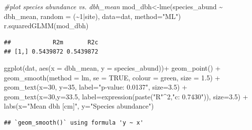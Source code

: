 \documentclass[
]{article}
\newenvironment{Shaded}{\begin{snugshade}}{\end{snugshade}}
\newcommand{\AttributeTok}[1]{\textcolor[rgb]{0.77,0.63,0.00}{#1}}
\newcommand{\CommentTok}[1]{\textcolor[rgb]{0.56,0.35,0.01}{\textit{#1}}}
\newcommand{\ConstantTok}[1]{\textcolor[rgb]{0.00,0.00,0.00}{#1}}
\newcommand{\DecValTok}[1]{\textcolor[rgb]{0.00,0.00,0.81}{#1}}
\newcommand{\FloatTok}[1]{\textcolor[rgb]{0.00,0.00,0.81}{#1}}
\newcommand{\FunctionTok}[1]{\textcolor[rgb]{0.00,0.00,0.00}{#1}}
\newcommand{\NormalTok}[1]{#1}
\newcommand{\OtherTok}[1]{\textcolor[rgb]{0.56,0.35,0.01}{#1}}
\newcommand{\SpecialCharTok}[1]{\textcolor[rgb]{0.00,0.00,0.00}{#1}}
\newcommand{\StringTok}[1]{\textcolor[rgb]{0.31,0.60,0.02}{#1}}
\begin{document}
\begin{Shaded}
\begin{Highlighting}[]
 \CommentTok{\#plot species abundance vs. dbh\_mean}
\NormalTok{mod\_dbh}\OtherTok{\textless{}{-}}\FunctionTok{lme}\NormalTok{(species\_abund }\SpecialCharTok{\textasciitilde{}}\NormalTok{ dbh\_mean, }\AttributeTok{random =}\NormalTok{ (}\SpecialCharTok{\textasciitilde{}}\DecValTok{1}\SpecialCharTok{|}\NormalTok{site), }\AttributeTok{data=}\NormalTok{dat, }\AttributeTok{method=}\StringTok{"ML"}\NormalTok{)}
\FunctionTok{r.squaredGLMM}\NormalTok{(mod\_dbh)}
\end{Highlighting}
\end{Shaded}

\begin{verbatim}
##            R2m       R2c
## [1,] 0.5439872 0.5439872
\end{verbatim}

\begin{Shaded}
\begin{Highlighting}[]
\FunctionTok{ggplot}\NormalTok{(dat, }\FunctionTok{aes}\NormalTok{(}\AttributeTok{x =}\NormalTok{ dbh\_mean, }\AttributeTok{y =}\NormalTok{ species\_abund))}\SpecialCharTok{+}
  \FunctionTok{geom\_point}\NormalTok{() }\SpecialCharTok{+}
  \FunctionTok{geom\_smooth}\NormalTok{(}\AttributeTok{method =}\NormalTok{ lm, }\AttributeTok{se =} \ConstantTok{TRUE}\NormalTok{, }\AttributeTok{colour =} \StringTok{\textquotesingle{}green\textquotesingle{}}\NormalTok{, }\AttributeTok{size =} \FloatTok{1.5}\NormalTok{) }\SpecialCharTok{+}
  \FunctionTok{geom\_text}\NormalTok{(}\AttributeTok{x=}\DecValTok{30}\NormalTok{, }\AttributeTok{y=}\DecValTok{35}\NormalTok{, }\AttributeTok{label=}\StringTok{"p{-}value: 0.0137"}\NormalTok{, }\AttributeTok{size=}\FloatTok{3.5}\NormalTok{) }\SpecialCharTok{+}
  \FunctionTok{geom\_text}\NormalTok{(}\AttributeTok{x=}\DecValTok{30}\NormalTok{,}\AttributeTok{y=}\FloatTok{33.5}\NormalTok{, }\AttributeTok{label=}\FunctionTok{expression}\NormalTok{(}\FunctionTok{paste}\NormalTok{(}\StringTok{"R"}\SpecialCharTok{\^{}}\DecValTok{2}\NormalTok{,}\StringTok{"c: 0.7430"}\NormalTok{)), }\AttributeTok{size=}\FloatTok{3.5}\NormalTok{) }\SpecialCharTok{+}
  \FunctionTok{labs}\NormalTok{(}\AttributeTok{x=}\StringTok{"Mean dbh [cm]"}\NormalTok{, }\AttributeTok{y=}\StringTok{"Species abundance"}\NormalTok{)}
\end{Highlighting}
\end{Shaded}

\begin{verbatim}
## `geom_smooth()` using formula 'y ~ x'
\end{verbatim}
\end{document}
